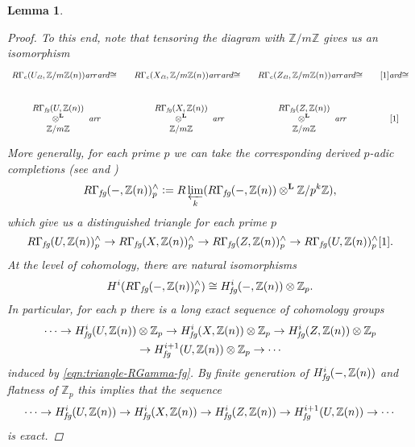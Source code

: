 \documentclass[10pt,a4paper,oneside]{article}
\newcommand{\ZZ}{\mathbb{Z}}
\newcommand{\ar}{\text{\it ar}}
\newcommand{\et}{\text{\it \'{e}t}}
\newcommand{\fg}{\text{\it fg}}
\newcommand{\dfn}{\mathrel{\mathop:}=}
\theoremstyle{myplain}
\newtheorem{lemma}[theorem]{Lemma}
\theoremstyle{mydefinition}
\numberwithin{equation}{section}
\begin{document}
\begin{lemma}
\begin{proof}
    To this end, note that tensoring the diagram with $\ZZ/m\ZZ$ gives us an
    isomorphism
    \[ \begin{tikzcd}[column sep=1em,font=\small]
        R\Gamma_c (U_\et, \ZZ/m\ZZ (n)) \ar{r}\ar{d}{\cong} & R\Gamma_c (X_\et, \ZZ/m\ZZ (n)) \ar{r}\ar{d}{\cong} & R\Gamma_c (Z_\et, \ZZ/m\ZZ (n)) \ar{r}\ar{d}{\cong} & {[1]}\ar{d}{\cong} \\
        \begin{array}{c} R\Gamma_\fg (U, \ZZ (n)) \\ \otimes^\mathbf{L} \\ \ZZ/m\ZZ \end{array} \ar{r} & \begin{array}{c} R\Gamma_\fg (X, \ZZ (n)) \\ \otimes^\mathbf{L} \\ \ZZ/m\ZZ \end{array} \ar{r} & \begin{array}{c} R\Gamma_\fg (Z, \ZZ (n)) \\ \otimes^\mathbf{L} \\ \ZZ/m\ZZ \end{array} \ar{r} & {[1]}
      \end{tikzcd} \]
    More generally, for each prime $p$ we can take the corresponding derived
    $p$-adic completions (see \cite{Bhatt-Scholze-2015} and
    \cite[Tag~091N]{Stacks-project})
    \[ R\Gamma_\fg (-, \ZZ(n))^\wedge_p \dfn
      R\varprojlim_k (R\Gamma_\fg (-, \ZZ(n)) \otimes^\mathbf{L} \ZZ/p^k\ZZ), \]
    which give us a distinguished triangle for each prime $p$
    \[ R\Gamma_\fg (U, \ZZ(n))^\wedge_p \to
      R\Gamma_\fg (X, \ZZ(n))^\wedge_p \to
      R\Gamma_\fg (Z, \ZZ(n))^\wedge_p \to
      R\Gamma_\fg (U, \ZZ(n))^\wedge_p [1]. \]
    At the level of cohomology, there are natural isomorphisms
    \cite[Tag~0A06]{Stacks-project}
    \[ H^i (R\Gamma_\fg (-, \ZZ(n))^\wedge_p) \cong
      H^i_\fg (-, \ZZ(n)) \otimes \ZZ_p. \]
    In particular, for each $p$ there is a long exact sequence of cohomology
    groups
    \begin{multline*}
      \cdots \to H^i_\fg (U, \ZZ(n)) \otimes \ZZ_p \to
      H^i_\fg (X, \ZZ(n)) \otimes \ZZ_p \to
      H^i_\fg (Z, \ZZ(n)) \otimes \ZZ_p \\
      \to H^{i+1}_\fg (U, \ZZ(n)) \otimes \ZZ_p \to \cdots
    \end{multline*}
    induced by \eqref{eqn:triangle-RGamma-fg}. By finite generation of
    $H^i_\fg (-, \ZZ(n))$ and flatness of $\ZZ_p$ this implies that the sequence
    \begin{equation}
      \label{eqn:RGamma-fg-long-exact-sequence}
      \cdots \to H^i_\fg (U, \ZZ(n)) \to
      H^i_\fg (X, \ZZ(n)) \to
      H^i_\fg (Z, \ZZ(n)) \to
      H^{i+1}_\fg (U, \ZZ(n)) \to \cdots
    \end{equation}
    is exact.


\end{proof}
\end{lemma}
\end{document}
